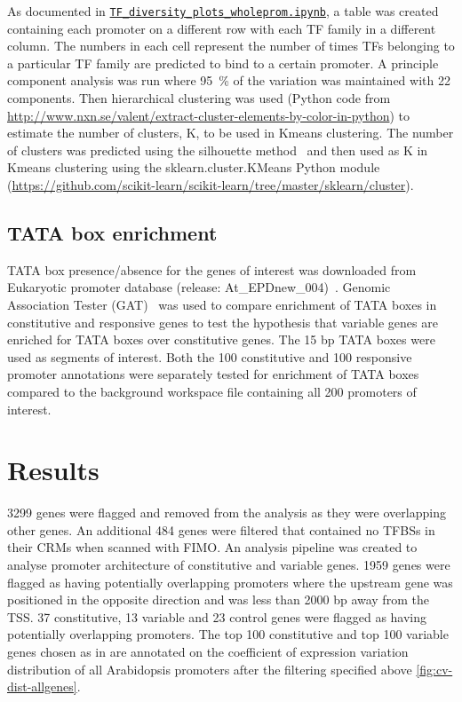 \documentclass[../main.tex]{subfiles}
\begin{document}
As documented in \href{https://github.com/Switham1/PromoterArchitecture/blob/master/src/plotting/TF_diversity_plots_wholeprom.ipynb}{\texttt{TF\_diversity\_plots\_wholeprom.ipynb}}, a table was created containing each promoter on a different row with each TF family in a different column.
The numbers in each cell represent the number of times TFs belonging to a particular TF family are predicted to bind to a certain promoter.
A principle component analysis was run where \SI{95}{\percent} of the variation was maintained with 22 components.
Then hierarchical clustering was used (Python code from \url{http://www.nxn.se/valent/extract-cluster-elements-by-color-in-python}) to estimate the number of clusters, K, to be used in Kmeans clustering.
The number of clusters was predicted using the silhouette method~\autocite{rousseeuwSilhouettesGraphicalAid1987} and then used as K in Kmeans clustering using the sklearn.cluster.KMeans Python module (\url{https://github.com/scikit-learn/scikit-learn/tree/master/sklearn/cluster}).

\subsection{TATA box enrichment}
\label{chapter1:methods:tata-box-enrichment}

TATA box presence/absence for the genes of interest was downloaded from Eukaryotic promoter database (release: At\_EPDnew\_004)~\autocite{dreosEukaryoticPromoterDatabase2017}.
Genomic Association Tester (GAT)~\autocite{hegerGATSimulationFramework2013} was used to
compare enrichment of TATA boxes in constitutive and responsive genes to test the hypothesis that variable genes are enriched for TATA boxes over constitutive genes.
The 15 bp TATA boxes were used as segments of interest. Both the 100 constitutive and 100 responsive promoter annotations were separately tested for enrichment of TATA boxes compared to the background workspace file containing all 200 promoters of interest.

\section{Results}
\label{chapter1:results}

3299 genes were flagged and removed from the analysis as they were overlapping other genes.
An additional 484 genes were filtered that contained no TFBSs in their CRMs when scanned with FIMO. 
An analysis pipeline was created to analyse promoter architecture of constitutive and variable genes.
1959 genes were flagged as having potentially overlapping promoters where the upstream gene was positioned in the opposite direction and was less than 2000 bp away from the TSS.
37 constitutive, 13 variable and 23 control genes were flagged as having potentially overlapping promoters.
The top 100 constitutive and top 100 variable genes chosen as in \textcite{czechowskiGenomeWideIdentificationTesting2005} are annotated on the  coefficient of expression variation distribution of all Arabidopsis promoters after the filtering specified above \autoref{fig:cv-dist-allgenes}.
\end{document}
